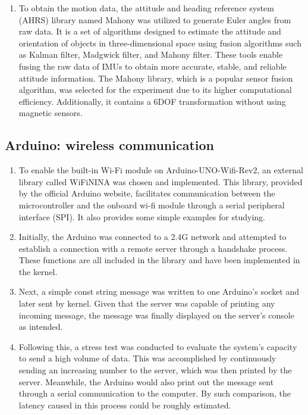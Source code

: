 \begin{enumerate}
	\item   To obtain the motion data, the attitude and heading reference system (AHRS) library named Mahony was utilized to generate Euler angles from raw data.
	It is a set of algorithms designed to estimate the attitude and orientation of objects in three-dimensional space using fusion algorithms such as Kalman filter, Madgwick filter, and Mahony filter.
	These tools enable fusing the raw data of IMUs to obtain more accurate, stable, and reliable attitude information.
	The Mahony library, which is a popular sensor fusion algorithm, was selected for the experiment due to its higher computational efficiency.
	Additionally, it contains a 6DOF transformation without using magnetic sensors.

\end{enumerate}


\subsection{Arduino: wireless communication} \label{subsec:5g-network}
\begin{enumerate}
	\item   To enable the built-in Wi-Fi module on Arduino-UNO-Wifi-Rev2, an external library called WiFiNINA was chosen and implemented.
	This library, provided by the official Arduino website, facilitates communication between the microcontroller and the onboard wi-fi module through a serial peripheral interface (SPI).
	It also provides some simple examples for studying.
	\item   Initially, the Arduino was connected to a 2.4G network and attempted to establish a connection with a remote server through a handshake process.
	These functions are all included in the library and have been implemented in the kernel.
	\item   Next, a simple const string message was written to one Arduino's socket and later sent by kernel.
	Given that the server was capable of printing any incoming message, the message was finally displayed on the server's console as intended.
	\item   Following this, a stress test was conducted to evaluate the system's capacity to send a high volume of data.
	This was accomplished by continuously sending an increasing number to the server, which was then printed by the server.
	Meanwhile, the Arduino would also print out the message sent through a serial communication to the computer.
	By such comparison, the latency caused in this process could be roughly estimated.
\end{enumerate}


